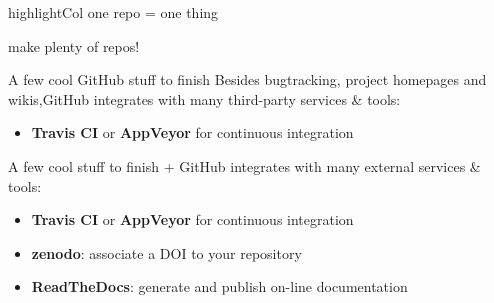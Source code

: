 \documentclass[compress]{beamer}
\newcommand{\highlight}[1]{%
    \vspace{1em}%
    \begin{beamercolorbox}[wd=\linewidth,ht=2ex,dp=0.7ex]{highlightCol}%
    \centering #1%
    \end{beamercolorbox}%
    \vspace{1em}%
}%
\begin{document}
\begin{frame}{}
    \centering
    \highlight{one repo = one thing}

    make plenty of repos!
\end{frame}


\begin{frame}{A few cool GitHub stuff to finish}
    Besides bugtracking, project homepages and wikis,GitHub integrates with many
    third-party services \& tools:

    \begin{itemize}
        \item {\bf Travis CI} or {\bf AppVeyor} for continuous integration
    \end{itemize}
\end{frame}


\begin{frame}{A few cool stuff to finish}
    + GitHub integrates with many external services 
    \& tools:

    \begin{itemize}
        \item {\bf Travis CI} or {\bf AppVeyor} for continuous integration
        \item {\bf zenodo}: associate a DOI to your repository
        \item {\bf ReadTheDocs}: generate and publish on-line 
            documentation
    \end{itemize}
\end{frame}
\end{document}
